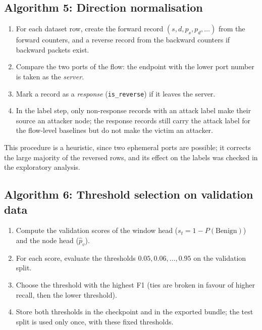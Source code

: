 \subsection{Algorithm 5: Direction normalisation}
\begin{enumerate}[label=\arabic*.]
	\item For each dataset row, create the forward record $(s,d,p_s,p_d,\dots)$ from the forward counters, and a reverse record from the backward counters if backward packets exist.
	\item Compare the two ports of the flow: the endpoint with the lower port number is taken as the \emph{server}.
	\item Mark a record as a \emph{response} (\texttt{is\_reverse}) if it leaves the server.
	\item In the label step, only non-response records with an attack label make their source an attacker node; the response records still carry the attack label for the flow-level baselines but do not make the victim an attacker.
\end{enumerate}
This procedure is a heuristic, since two ephemeral ports are possible; it corrects the large majority of the reversed rows, and its effect on the labels was checked in the exploratory analysis.

\subsection{Algorithm 6: Threshold selection on validation data}
\begin{enumerate}[label=\arabic*.]
	\item Compute the validation scores of the window head ($s_t=1-P(\text{Benign})$) and the node head ($\hat{p}_v$).
	\item For each score, evaluate the thresholds $0.05,0.06,\dots,0.95$ on the validation split.
	\item Choose the threshold with the highest F1 (ties are broken in favour of higher recall, then the lower threshold).
	\item Store both thresholds in the checkpoint and in the exported bundle; the test split is used only once, with these fixed thresholds.
\end{enumerate}

